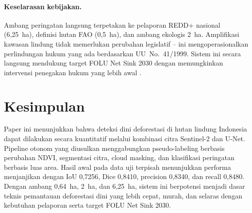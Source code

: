 \documentclass[10pt,a4paper,onecolumn]{article}
\begin{document}
\paragraph{Keselarasan kebijakan.}
Ambang peringatan langsung terpetakan ke pelaporan REDD+ nasional
(6,25~ha), definisi hutan FAO (0,5~ha), dan ambang ekologis 2~ha.
Amplifikasi kawasan lindung tidak memerlukan perubahan legislatif --
ini mengoperasionalkan perlindungan hukum yang ada berdasarkan
UU~No.~41/1999. Sistem ini secara langsung mendukung target FOLU
Net Sink 2030 dengan memungkinkan intervensi penegakan hukum yang
lebih awal \cite{ipcc2019land}.

\section{Kesimpulan}
Paper ini menunjukkan bahwa deteksi dini deforestasi di hutan lindung
Indonesia dapat dilakukan secara kuantitatif melalui kombinasi citra
Sentinel-2 dan U-Net. Pipeline otonom yang diusulkan menggabungkan
pseudo-labeling berbasis perubahan NDVI, segmentasi citra, cloud masking,
dan klasifikasi peringatan berbasis luas area. Hasil awal pada data uji
terpisah menunjukkan performa menjanjikan dengan IoU 0,7256, Dice
0,8410, precision 0,8340, dan recall 0,8480. Dengan ambang 0,64~ha,
2~ha, dan 6,25~ha, sistem ini berpotensi menjadi dasar teknis pemantauan
deforestasi dini yang lebih cepat, murah, dan selaras dengan kebutuhan
pelaporan serta target FOLU Net Sink 2030.



\small
\renewcommand{\refname}{Daftar Pustaka}


\end{document}
